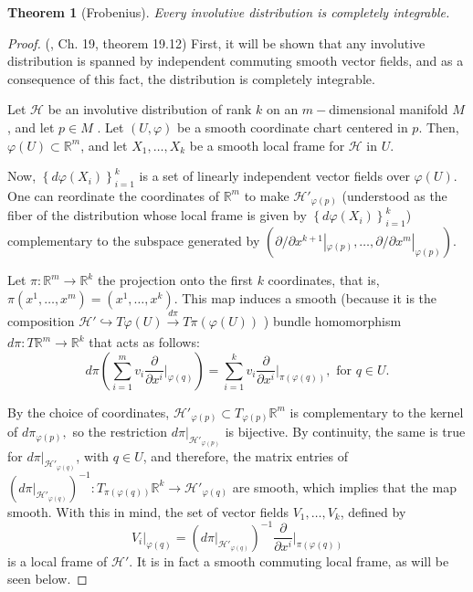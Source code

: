 \documentclass[12pt, letterpaper, reqno]{amsart}
\theoremstyle{definition}
\theoremstyle{plain}
\newtheorem{thm}{Theorem}
\theoremstyle{remark}
\begin{document}
\begin{thm}[Frobenius]
	Every involutive distribution is completely integrable.	
\end{thm}

\begin{proof}
	(\cite{lee2003introduction}, Ch. 19, theorem 19.12) First, it will be shown that any involutive distribution is spanned by independent commuting smooth vector fields, and as a consequence of this fact, the distribution is completely integrable.

	Let $ \mathcal{H} $ be an involutive distribution of rank $ k $ on an $ m- $dimensional manifold $ M $, and let $ p\in M $ . Let $ (U,\varphi) $ be a smooth coordinate chart centered in $ p. $ Then, $ \varphi(U)\subset \mathbb{R}^m $, and let $ X_1,\dots,X_k $ be a smooth local frame for $ \mathcal{H} $ in $ U. $

	Now, $ \left\{ d\varphi \left( X_i \right) \right\}_{i=1}^k $ is a set of linearly independent vector fields over $ \varphi(U). $ One can reordinate the coordinates of $ \mathbb{R}^m $ to make $ \mathcal{H}'_{\varphi(p)} $ (understood as the fiber of the distribution whose local frame is given by $ \left\{ d\varphi \left( X_i \right) \right\}_{i=1}^k $) complementary to the subspace generated by $ \left( \partial/\partial x^{k+1}|_{\varphi(p)},\dots,\partial/\partial x^{m}|_{\varphi(p)} \right). $   

	Let $ \pi: \mathbb{R}^m \rightarrow  \mathbb{R}^k$ the projection onto the first $ k $ coordinates, that is, $ \pi(x^1,\dots,x^m)=(x^1,\dots,x^k). $ This map induces a smooth (because it is the composition $\mathcal{H}' \hookrightarrow T\varphi(U) \xrightarrow[]{d\pi} T\pi(\varphi(U))$ )  bundle homomorphism $ d\pi: T \mathbb{R}^m \rightarrow \mathbb{R}^k	 $ that acts as follows:
	$$ d\pi \left( \sum_{i=1}^m v_i \frac{\partial}{\partial x^i} \Big|_{\varphi(q)}   \right) = \sum_{i=1}^k v_i \frac{\partial}{\partial x^i} \Big|_{\pi(\varphi(q))}, \text{ for }q\in U.$$ 

	By the choice of coordinates, $ \mathcal{H}'_{\varphi(p)}\subset T_{\varphi(p)} \mathbb{R}^m $ is complementary to the kernel of $ d\pi_{\varphi(p)}, $ so the restriction $ d\pi|_{\mathcal{H}'_{\varphi(p)}} $ is bijective. By continuity, the same is true for $ d\pi|_{\mathcal{H}'_{\varphi(q)}} $, with $ q\in U $, and therefore, the matrix entries of $ \left(d\pi|_{\mathcal{H}'_{\varphi(q)}} \right)^{-1}: T_{\pi(\varphi(q))} \mathbb{R}^k \rightarrow \mathcal{H}'_{\varphi(q)}$ are smooth, which implies that the map smooth. With this in mind, the set of vector fields $ V_1,\dots,V_k $, defined by
	$$ V_i|_{\varphi(q)}= \left(  d\pi|_{\mathcal{H}'_{\varphi(q)}}  \right)^{-1} \frac{\partial}{\partial x^i} \Big|_{\pi(\varphi(q))} $$ 
	is a local frame of $ \mathcal{H'}. $ It is in fact a smooth commuting local frame, as will be seen below. 


\end{proof}
\end{document}
